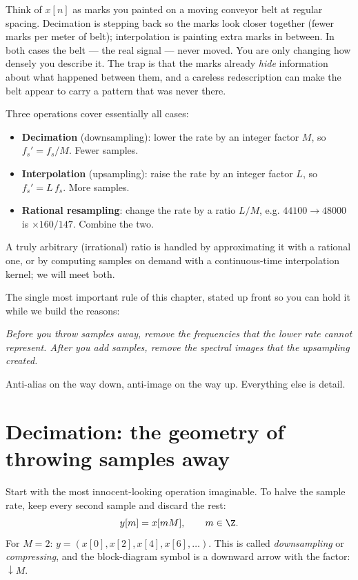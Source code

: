 \begin{intuitionbox}
Think of $x[n]$ as marks you painted on a moving conveyor belt at regular
spacing. Decimation is stepping back so the marks look closer together (fewer
marks per meter of belt); interpolation is painting extra marks in between. In
both cases the belt --- the real signal --- never moved. You are only changing
how densely you describe it. The trap is that the marks already \emph{hide}
information about what happened between them, and a careless redescription can
make the belt appear to carry a pattern that was never there.
\end{intuitionbox}

Three operations cover essentially all cases:
\begin{itemize}
  \item \textbf{Decimation} (downsampling): lower the rate by an integer factor
  $M$, so $f_s' = f_s/M$. Fewer samples.
  \item \textbf{Interpolation} (upsampling): raise the rate by an integer
  factor $L$, so $f_s' = L\,f_s$. More samples.
  \item \textbf{Rational resampling}: change the rate by a ratio $L/M$, e.g.
  $44100 \to 48000$ is $\times 160/147$. Combine the two.
\end{itemize}
A truly arbitrary (irrational) ratio is handled by approximating it with a
rational one, or by computing samples on demand with a continuous-time
interpolation kernel; we will meet both.

\begin{focusbox}
The single most important rule of this chapter, stated up front so you can hold
it while we build the reasons:
\begin{center}
\emph{Before you throw samples away, remove the frequencies that the lower rate
cannot represent. After you add samples, remove the spectral images that the
upsampling created.}
\end{center}
Anti-alias on the way down, anti-image on the way up. Everything else is
detail.
\end{focusbox}

\section{Decimation: the geometry of throwing samples away}
\label{ch22:decim}

Start with the most innocent-looking operation imaginable. To halve the sample
rate, keep every second sample and discard the rest:
\begin{equation}
  y[m] = x[mM], \qquad m \in \Z.
  \label{ch22:downdef}
\end{equation}
For $M=2$: $y = (x[0], x[2], x[4], x[6], \dots)$. This is called
\emph{downsampling} or \emph{compressing}, and the block-diagram symbol is a
downward arrow with the factor: $\downarrow M$.

